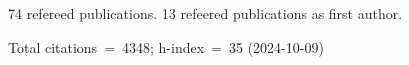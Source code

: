 74 refereed publications. 13 refeered publications as first author.

Total citations~=~4348; h-index~=~35 (2024-10-09)
